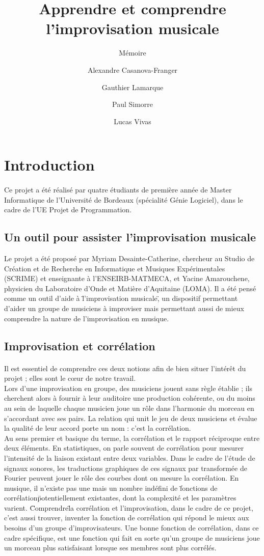 \documentclass{article}
\title{Apprendre et comprendre l'improvisation musicale}
\subtitle{Mémoire}
\author{Alexandre Casanova-Franger\\
  \and
  Gauthier Lamarque\\
  \and
  Paul Simorre\\
  \and
  Lucas Vivas\\}
\begin{document}
\malketitle
\section{Introduction}
\paragraph{}
Ce projet a été réalisé par quatre étudiants de première année de Master Informatique de l'Université de Bordeaux (spécialité Génie Logiciel), dans le cadre de l'UE Projet de Programmation.

\subsection{Un outil pour assister l'improvisation musicale}
Le projet a été proposé par Myriam Desainte-Catherine, chercheur au Studio de Création et de Recherche en Informatique et Musiques Expérimentales (SCRIME) et enseignante à l'ENSEIRB-MATMECA, et Yacine Amarouchene, physicien du Laboratoire d'Onde et Matière d'Aquitaine (LOMA). Il a été pensé comme un outil d'aide à \"l'improvisation musicale\", un dispositif permettant d'aider un groupe de musiciens à improviser mais permettant aussi de mieux comprendre la nature de l'improvisation en musique.

\subsection{Improvisation et corrélation}
\paragraph{}
Il est essentiel de comprendre ces deux notions afin de bien situer l'intérêt du projet ; elles sont le c\oe ur de notre travail. \\
Lors d'une improvisation en groupe, des musiciens jouent sans règle établie ; ils cherchent alors à fournir à leur auditoire une production cohérente, ou du moins au sein de laquelle chaque musicien joue un rôle dans l'harmonie du morceau en s'accordant avec ses pairs. La relation qui unit le jeu de deux musiciens et évalue la qualité de leur accord porte un nom : c'est la corrélation. \\
Au sens premier et basique du terme, la corrélation et le rapport réciproque entre deux éléments. En statistiques, on parle souvent de corrélation pour mesurer l'intensité de la liaison existant entre deux variables. Dans le cadre de l'étude de signaux sonores, les traductions graphiques de ces signaux par transformée de Fourier peuvent jouer le rôle des courbes dont on mesure la corrélation. En musique, il n'existe pas une mais un nombre indéfini de \"fonctions de corrélation\"potentiellement existantes, dont la complexité et les paramètres varient. \" Comprendre\" la corrélation et l'improvisation, dans le cadre de ce projet, c'est aussi trouver, inventer la fonction de corrélation qui répond le mieux aux besoins d'un groupe d'improvisateurs. Une bonne fonction de corrélation, dans ce cadre spécifique, est une fonction qui fait en sorte qu'un groupe de musiciens joue un morceau plus satisfaisant lorsque ses membres sont plus corrélés. \\
\end{document}
